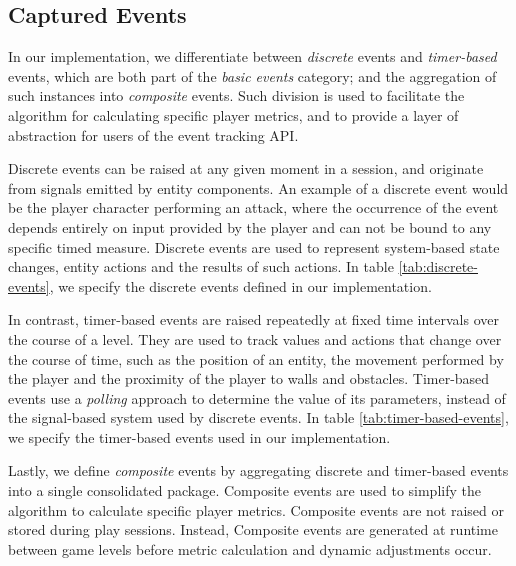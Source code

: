 \subsection{Captured Events}

In our implementation, we differentiate between \emph{discrete} events and \emph{timer-based} events, which are both part of the \emph{basic events} category; and the aggregation of such instances into \emph{composite} events. Such division is used to facilitate the algorithm for calculating specific player metrics, and to provide a layer of abstraction for users of the event tracking API.


Discrete events can be raised at any given moment in a session, and originate from signals emitted by entity components. An example of a discrete event would be the player character performing an attack, where the occurrence of the event depends entirely on input provided by the player and can not be bound to any specific timed measure. Discrete events are used to represent system-based state changes, entity actions and the results of such actions. In table \ref{tab:discrete-events}, we specify the discrete events defined in our implementation.



In contrast, timer-based events are raised repeatedly at fixed time intervals over the course of a level. They are used to track values and actions that change over the course of time, such as the position of an entity, the movement performed by the player and the proximity of the player to walls and obstacles. Timer-based events use a \emph{polling} approach to determine the value of its parameters, instead of the signal-based system used by discrete events. In table \ref{tab:timer-based-events}, we specify the timer-based events used in our implementation.



Lastly, we define \emph{composite} events by aggregating discrete and timer-based events into a single consolidated package. Composite events are used to simplify the algorithm to calculate specific player metrics. Composite events are not raised or stored during play sessions. Instead, Composite events are generated at runtime between game levels before metric calculation and dynamic adjustments occur.

